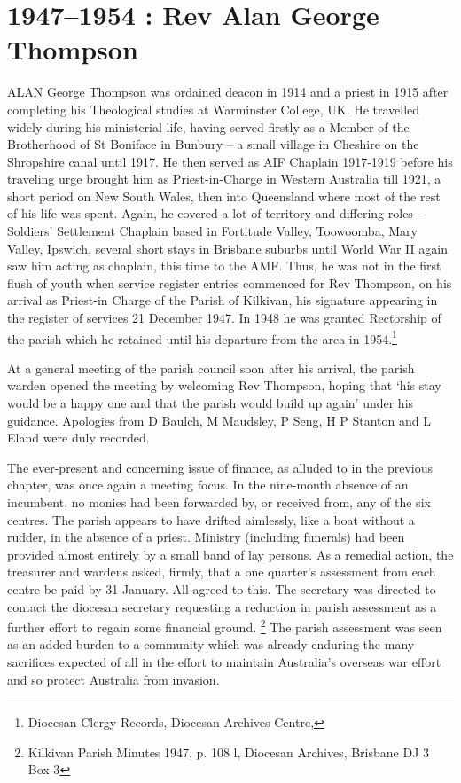 \balance


\printendnotes[custom]
\setcounter{endnote}{0}
\chapter{1947--1954 : Rev Alan George Thompson}
\nobalance


\lettrine[lines=3]{A}{LAN}
 George Thompson was ordained deacon in 1914 and a priest in 1915 after completing his Theological studies at Warminster College, UK. He travelled widely during his ministerial life, having served firstly as a Member of the Brotherhood of St Boniface in Bunbury -- a small village in Cheshire on the Shropshire canal until 1917. He then served as AIF Chaplain 1917-1919 before his traveling urge brought him as Priest-in-Charge in Western Australia till 1921, a short period on New South Wales, then into Queensland where most of the rest of his life was spent. Again, he covered a lot of territory and differing roles - Soldiers' Settlement Chaplain based in Fortitude Valley, Toowoomba, Mary Valley, Ipswich, several short stays in Brisbane suburbs until World War II again saw him acting as chaplain, this time to the AMF. Thus, he was not in the first flush of youth when service register entries commenced for Rev Thompson, on his arrival as Priest-in Charge of the Parish of Kilkivan, his signature appearing in the register of services 21 December 1947. In 1948 he was granted Rectorship of the parish which he retained until his departure from the area in 1954.\footnote{Diocesan Clergy Records, Diocesan Archives Centre,}

At a general meeting of the parish council soon after his arrival, the parish warden opened the meeting by welcoming Rev Thompson, hoping that `his stay would be a happy one and that the parish would build up again' under his guidance. Apologies from D Baulch, M Maudsley, P Seng, H P Stanton and L Eland were duly recorded.



The ever-present and concerning issue of finance, as alluded to in the previous chapter, was once again a meeting focus. In the nine-month absence of an incumbent, no monies had been forwarded by, or received from, any of the six centres. The parish appears to have drifted aimlessly, like a boat without a rudder, in the absence of a priest. Ministry (including funerals) had been provided almost entirely by a small band of lay persons. As a remedial action, the treasurer and wardens asked, firmly, that a one quarter's assessment from each centre be paid by 31 January. All agreed to this. The secretary was directed to contact the diocesan secretary requesting a reduction in parish assessment as a further effort to regain some financial ground. \footnote{Kilkivan Parish Minutes 1947, p. 108 l, Diocesan Archives, Brisbane DJ 3 Box 3} The parish assessment was seen as an added burden to a community which was already enduring the many sacrifices expected of all in the effort to maintain Australia's overseas war effort and so protect Australia from invasion.


